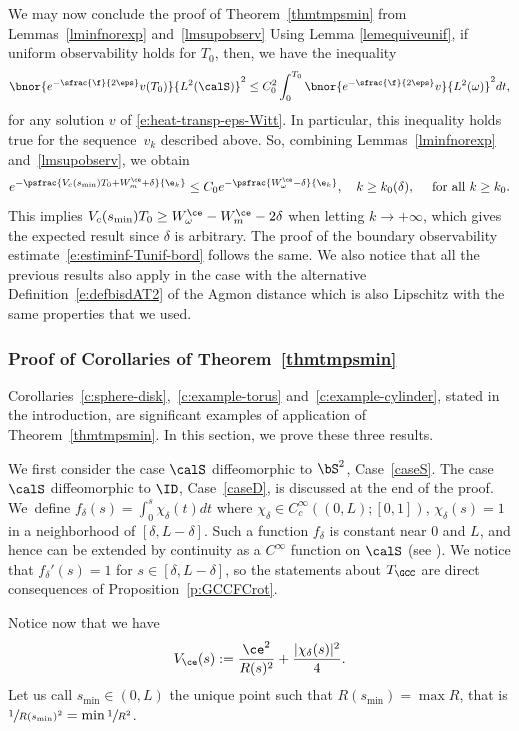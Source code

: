 We may now conclude the proof of Theorem~\ref{thmtmpsmin} from Lemmas~\ref{lminfnorexp} and~\ref{lmsupobserv}
Using Lemma \ref{lemequiveunif}, if uniform observability holds for $T_{0}$, then, we have the inequality
\[
\bnor{e^{-\sfrac{\f}{2\eps}}v(T_0)}{L^2(\calS)}^2 \leq C_0^2\int_0^{T_0}\bnor{e^{-\sfrac{\f}{2\eps}}v }{L^2(\omega)}^2 dt,
\]
for any solution $v$ of \eqref{e:heat-transp-eps-Witt}. In particular, this inequality holds true for the sequence~$v_{k}$ described above. So, combining Lemmas~\ref{lminfnorexp} and~\ref{lmsupobserv}, we obtain
\[
e^{-\psfrac{V_{c}(s_{\min})T_{0}+W^{\ce}_m+\delta }{\e_k}}\leq C_{0}e^{-\psfrac{W^{\ce}_{\omega} - \delta }{\e_k} }, \quad k\geq k_{0}(\delta), \quad \text{ for all } k\geq k_0.
\]
This implies $V_{c}(s_{\min})T_0\geq W^{\ce}_{\omega}-W^{\ce}_{m}-2\delta$ when letting $k\to +\infty$, which gives the expected result since $\delta$ is arbitrary.
The proof of the boundary observability estimate~\eqref{e:estiminf-Tunif-bord} follows the same. We also notice that all the previous results also apply in the case with the alternative Definition~\ref{e:defbisdAT2} of the Agmon distance which is also Lipschitz with the same properties that we used.
\enp

\subsubsection{Proof of Corollaries of Theorem~\ref{thmtmpsmin}}

Corollaries~\ref{c:sphere-disk},~\ref{c:example-torus} and~\ref{c:example-cylinder}, stated in the introduction, are significant examples of application of Theorem~\ref{thmtmpsmin}.
In this section, we prove these three results.

We first consider the case $\calS$ diffeomorphic to $\bS^2$, \ie Case~\ref{caseS}. The case $\calS$ diffeomorphic to $\ID$, \ie Case~\ref{caseD}, is discussed at the end of the proof.
We~define $f_\delta (s) = \int_0^s \chi_\delta (t) dt$ where $\chi_\delta \in C^\infty_c((0,L);[0,1])$, $\chi_\delta(s) =1$ in a neighborhood of $[\delta, L-\delta]$. Such a function $f_\delta$ is constant near $0$ and $L$, and hence can be extended by continuity as a $C^\infty$ function on $\calS$ (see \eg \cite[Prop.\,4.6]{Besse}). We notice that $f_\delta' (s)=1$ for $s\in [\delta,L-\delta]$, so the statements about $T_{\GCC}$ are direct consequences of Proposition~\ref{p:GCCFCrot}.

Notice now that we have
\[
V_\ce (s) := \frac{\ce^2}{R(s)^2} + \frac{|\chi_\delta(s)|^2}{4}.
\]
Let us call $s_{\min} \in (0,L)$ the unique point such that $R(s_{\min}) = \max R$, that is $\sfrac{1}{R(s_{\min})^2}= \min \sfrac{1}{R^2}$.


